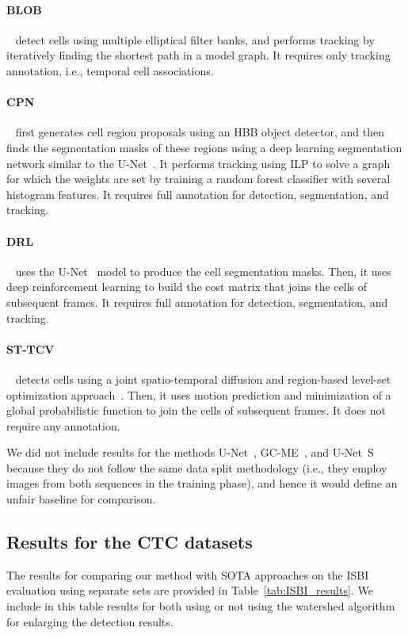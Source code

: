 \documentclass{article}
\begin{document}
\paragraph{BLOB}~\cite{blob} detect cells using multiple elliptical filter banks, and performs tracking by iteratively finding the shortest path in a model graph. It requires only tracking annotation, i.e., temporal cell associations.

\paragraph{CPN}~\cite{cpn} first generates cell region proposals using an HBB object detector, and then finds the segmentation masks of these regions using a deep learning segmentation network similar to the U-Net~\cite{unet}. It performs tracking using ILP to solve a graph for which the weights are set by training a random forest classifier with several histogram features. It requires full annotation for detection, segmentation, and tracking.

\paragraph{DRL}~\cite{drl} uses the U-Net~\cite{unet} model to produce the cell segmentation masks. Then, it uses deep reinforcement learning to build the cost matrix that joins the cells of subsequent frames. It requires full annotation for detection, segmentation, and tracking.

\paragraph{ST-TCV}~\cite{boukari2018automated} detects cells using a joint spatio-temporal diffusion and region-based level-set optimization approach~\cite{boukari2016joint}. Then, it uses motion prediction and minimization of a global probabilistic function to join the cells of subsequent frames. It does not require any annotation.

We did not include results for the methods U-Net~\cite{unet}, GC-ME~\cite{gcme}, and U-Net~S~\cite{unets} because they do not follow the same data split methodology (i.e., they employ images from both sequences in the training phase), and hence it would define an unfair baseline for comparison.

\subsection{Results for the CTC datasets}
The results for comparing our method with SOTA approaches on the ISBI evaluation using separate sets are provided in Table~\ref{tab:ISBI_results}. We include in this table results for both using or not using the watershed algorithm for enlarging the detection results.
\end{document}
